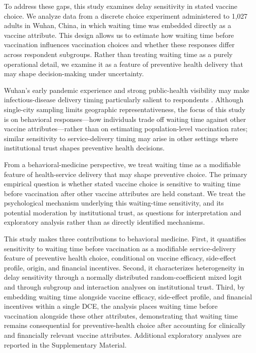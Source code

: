 \documentclass[12pt]{article}
\begin{document}
To address these gaps, this study examines delay sensitivity in stated vaccine choice. We analyze data from a discrete choice experiment administered to 1{,}027 adults in Wuhan, China, in which waiting time was embedded directly as a vaccine attribute. This design allows us to estimate how waiting time before vaccination influences vaccination choices and whether these responses differ across respondent subgroups. Rather than treating waiting time as a purely operational detail, we examine it as a feature of preventive health delivery that may shape decision-making under uncertainty.

Wuhan's early pandemic experience and strong public-health visibility may make infectious-disease delivery timing particularly salient to respondents \parencite{Barak2022}. Although single-city sampling limits geographic representativeness, the focus of this study is on behavioral responses---how individuals trade off waiting time against other vaccine attributes---rather than on estimating population-level vaccination rates; similar sensitivity to service-delivery timing may arise in other settings where institutional trust shapes preventive health decisions.

From a behavioral-medicine perspective, we treat waiting time as a modifiable feature of health-service delivery that may shape preventive choice. The primary empirical question is whether stated vaccine choice is sensitive to waiting time before vaccination after other vaccine attributes are held constant. We treat the psychological mechanism underlying this waiting-time sensitivity, and its potential moderation by institutional trust, as questions for interpretation and exploratory analysis rather than as directly identified mechanisms.

This study makes three contributions to behavioral medicine. First, it quantifies sensitivity to waiting time before vaccination as a modifiable service-delivery feature of preventive health choice, conditional on vaccine efficacy, side-effect profile, origin, and financial incentives. Second, it characterizes heterogeneity in delay sensitivity through a normally distributed random-coefficient mixed logit and through subgroup and interaction analyses on institutional trust. Third, by embedding waiting time alongside vaccine efficacy, side-effect profile, and financial incentives within a single DCE, the analysis places waiting time before vaccination alongside these other attributes, demonstrating that waiting time remains consequential for preventive-health choice after accounting for clinically and financially relevant vaccine attributes. Additional exploratory analyses are reported in the Supplementary Material.
\end{document}
